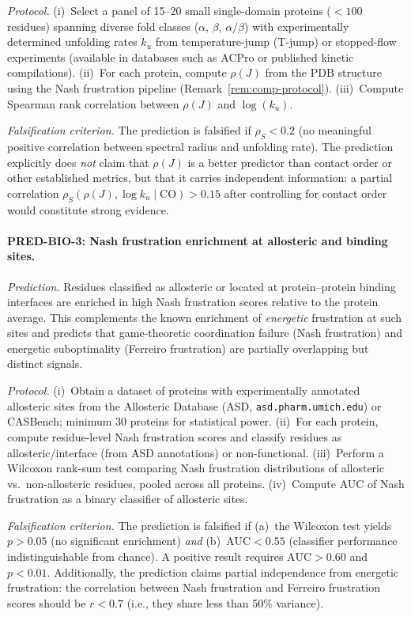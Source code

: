 \documentclass[12pt,a4paper]{article}
\theoremstyle{remark}
\begin{document}
\textit{Protocol.}
(i)~Select a panel of 15--20 small single-domain proteins ($< 100$ residues) spanning diverse fold classes ($\alpha$, $\beta$, $\alpha/\beta$) with experimentally determined unfolding rates $k_u$ from temperature-jump (T-jump) or stopped-flow experiments (available in databases such as ACPro or published kinetic compilations).
(ii)~For each protein, compute $\rho(J)$ from the PDB structure using the Nash frustration pipeline (Remark~\ref{rem:comp-protocol}).
(iii)~Compute Spearman rank correlation between $\rho(J)$ and $\log(k_u)$.

\textit{Falsification criterion.}
The prediction is falsified if $\rho_S < 0.2$ (no meaningful positive correlation between spectral radius and unfolding rate). The prediction explicitly does \emph{not} claim that $\rho(J)$ is a better predictor than contact order or other established metrics, but that it carries independent information: a partial correlation $\rho_S(\rho(J), \log k_u \mid \text{CO}) > 0.15$ after controlling for contact order would constitute strong evidence.

\paragraph{PRED-BIO-3: Nash frustration enrichment at allosteric and binding sites.}

\textit{Prediction.}
Residues classified as allosteric or located at protein--protein binding interfaces are enriched in high Nash frustration scores relative to the protein average. This complements the known enrichment of \emph{energetic} frustration at such sites \citep{Ferreiro2014} and predicts that game-theoretic coordination failure (Nash frustration) and energetic suboptimality (Ferreiro frustration) are partially overlapping but distinct signals.

\textit{Protocol.}
(i)~Obtain a dataset of proteins with experimentally annotated allosteric sites from the Allosteric Database (ASD, \texttt{asd.pharm.umich.edu}) or CASBench; minimum 30 proteins for statistical power.
(ii)~For each protein, compute residue-level Nash frustration scores and classify residues as allosteric/interface (from ASD annotations) or non-functional.
(iii)~Perform a Wilcoxon rank-sum test comparing Nash frustration distributions of allosteric vs.\ non-allosteric residues, pooled across all proteins.
(iv)~Compute AUC of Nash frustration as a binary classifier of allosteric sites.

\textit{Falsification criterion.}
The prediction is falsified if (a)~the Wilcoxon test yields $p > 0.05$ (no significant enrichment) \emph{and} (b)~$\text{AUC} < 0.55$ (classifier performance indistinguishable from chance). A positive result requires $\text{AUC} > 0.60$ and $p < 0.01$. Additionally, the prediction claims partial independence from energetic frustration: the correlation between Nash frustration and Ferreiro frustration scores should be $r < 0.7$ (i.e., they share less than 50\% variance).
\end{document}
